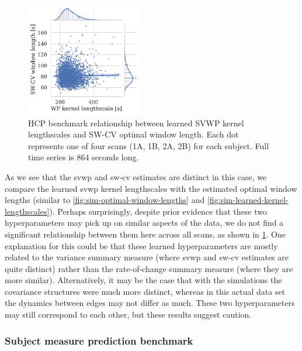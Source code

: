 \begin{figure}[t]
  \centering
  \includegraphics[width=0.45\textwidth]{fig/hcp/d15/lengthscale_optimal_window_length_relations}
  \caption{
    HCP benchmark relationship between learned SVWP kernel lengthscales and SW-CV optimal window length.
    Each dot represents one of four scans (1A, 1B, 2A, 2B) for each subject.
    Full time series is 864 seconds long.
  }
  \label{fig:sim-relationship-lengthscale-optimal-window-length}
\end{figure}


As we see that the \gls{svwp} and \gls{sw-cv} estimates are distinct in this case, we compare the learned \gls{svwp} kernel lengthscales with the estimated optimal window lengths (similar to \cref{fig:sim-optimal-window-lengths} and \cref{fig:sim-learned-kernel-lengthscales}).
Perhaps surprisingly, despite prior evidence that these two hyperparameters may pick up on similar aspects of the data, we do not find a significant relationship between them here across all scans, as shown in \cref{fig:sim-relationship-lengthscale-optimal-window-length}.
One explanation for this could be that these learned hyperparameters are mostly related to the variance summary measure (where \gls{svwp} and \gls{sw-cv} estimates are quite distinct) rather than the rate-of-change summary measure (where they are more similar).
Alternatively, it may be the case that with the simulations the covariance structures were much more distinct, whereas in this actual data set the dynamics between edges may not differ as much.
These two hyperparameters may still correspond to each other, but these results suggest caution.

\subsubsection{Subject measure prediction benchmark}


